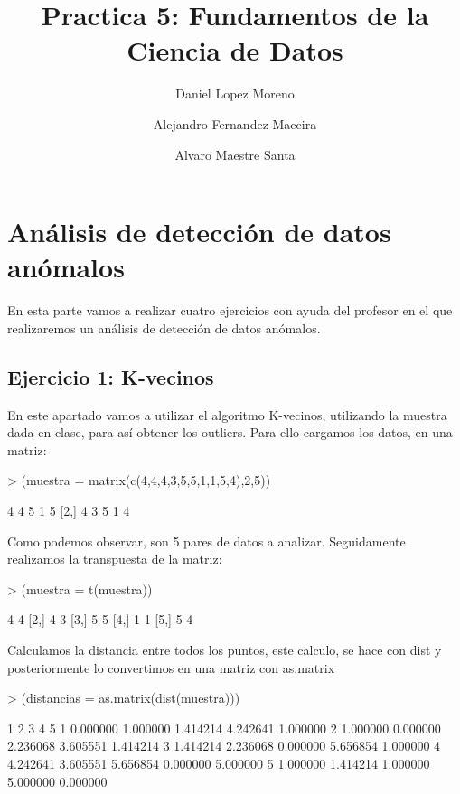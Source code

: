 \documentclass [a4paper] {article}
\title{Practica 5: Fundamentos de la Ciencia de Datos}
\author{
  Daniel Lopez Moreno\\
  \and
  Alejandro Fernandez Maceira\\
  \and
  Alvaro Maestre Santa
}
\begin{document}
\maketitle

\section{Análisis de detección de datos anómalos}
En esta parte vamos a realizar cuatro ejercicios con ayuda del profesor en el que realizaremos 
un análisis de detección de datos anómalos.

\subsection{Ejercicio 1: K-vecinos}
En este apartado vamos a utilizar el algoritmo K-vecinos, utilizando la muestra dada en clase,
para así obtener los outliers.
Para ello cargamos los datos, en una matriz:

\begin{Schunk}
\begin{Sinput}
> (muestra = matrix(c(4,4,4,3,5,5,1,1,5,4),2,5))
\end{Sinput}
\begin{Soutput}
     [,1] [,2] [,3] [,4] [,5]
[1,]    4    4    5    1    5
[2,]    4    3    5    1    4
\end{Soutput}
\end{Schunk}

Como podemos observar, son 5 pares de datos a analizar. Seguidamente realizamos la transpuesta de
la matriz:

\begin{Schunk}
\begin{Sinput}
> (muestra = t(muestra))
\end{Sinput}
\begin{Soutput}
     [,1] [,2]
[1,]    4    4
[2,]    4    3
[3,]    5    5
[4,]    1    1
[5,]    5    4
\end{Soutput}
\end{Schunk}

Calculamos la distancia entre todos los puntos, este calculo, se hace con dist y posteriormente
lo convertimos en una matriz con as.matrix

\begin{Schunk}
\begin{Sinput}
> (distancias = as.matrix(dist(muestra)))
\end{Sinput}
\begin{Soutput}
         1        2        3        4        5
1 0.000000 1.000000 1.414214 4.242641 1.000000
2 1.000000 0.000000 2.236068 3.605551 1.414214
3 1.414214 2.236068 0.000000 5.656854 1.000000
4 4.242641 3.605551 5.656854 0.000000 5.000000
5 1.000000 1.414214 1.000000 5.000000 0.000000
\end{Soutput}
\end{Schunk}
\end{document}
